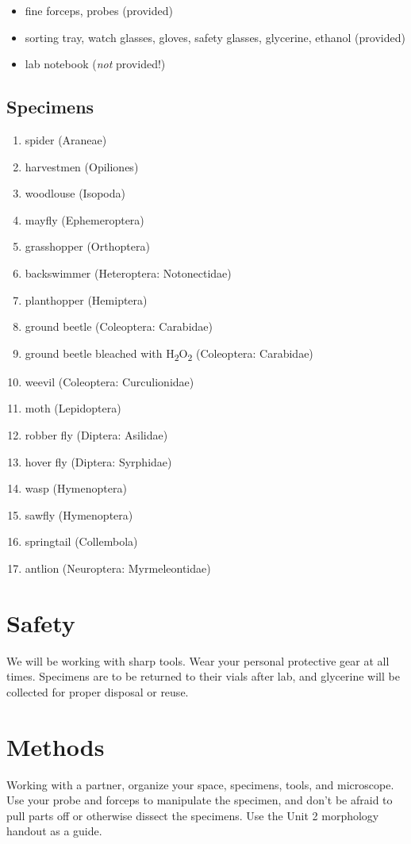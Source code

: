 \documentclass[letterpaper, 11pt]{article}
\begin{document}
\begin{itemize}
\item fine forceps, probes (provided)
\item sorting tray, watch glasses, gloves, safety glasses, glycerine, ethanol (provided)
\item {lab notebook (\textit{not} provided!)}
\end{itemize}

\subsection*{Specimens}

\begin{enumerate}
\item spider (Araneae)
\item harvestmen (Opiliones)
\item woodlouse (Isopoda)
\item mayfly (Ephemeroptera)
\item grasshopper (Orthoptera)
\item backswimmer (Heteroptera: Notonectidae)
\item planthopper (Hemiptera)
\item ground beetle (Coleoptera: Carabidae)
\item ground beetle bleached with H\textsubscript{2}O\textsubscript{2} (Coleoptera: Carabidae)
\item weevil (Coleoptera: Curculionidae)
\item moth (Lepidoptera)
\item robber fly (Diptera: Asilidae)
\item hover fly (Diptera: Syrphidae)
\item wasp (Hymenoptera)
\item sawfly (Hymenoptera)
\item springtail (Collembola)
\item antlion (Neuroptera: Myrmeleontidae)
\end{enumerate}

\section*{Safety}
We will be working with sharp tools. Wear your personal protective gear at all times. Specimens are to be returned to their vials after lab, and glycerine will be collected for proper disposal or reuse.

\section*{Methods}
Working with a partner, organize your space, specimens, tools, and microscope. Use your probe and forceps to manipulate the specimen, and don't be afraid to pull parts off or otherwise dissect the specimens. Use the Unit 2 morphology handout as a guide.
\end{document}
